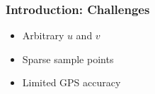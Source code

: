 \documentclass{beamer}
\theoremstyle{definition}
\begin{document}
\begin{frame}
\frametitle{Introduction: Challenges}
\begin{itemize}
	\item <2-> Arbitrary $u$ and $v$
	\item <3-> Sparse sample points
	\item <4-> Limited GPS accuracy
\end{itemize}

\begin{figure}
\centering
{}
\end{figure}
\end{frame}
\end{document}
